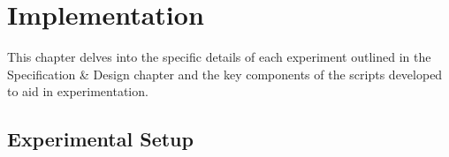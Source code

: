 \chapter{Implementation}

This chapter delves into the specific details of each experiment outlined in the Specification \& Design chapter and the key components of the scripts developed to aid in experimentation.

\section{Experimental Setup}

